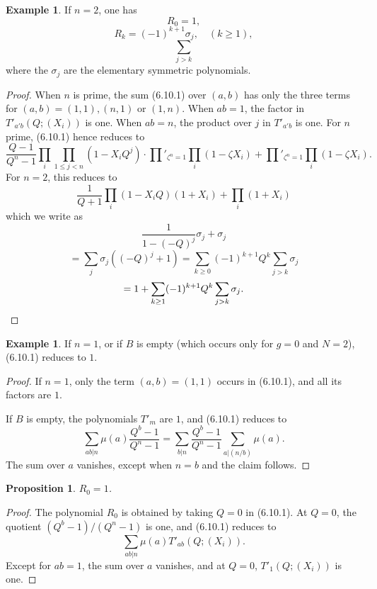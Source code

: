 \documentclass[11pt,a4paper]{article}
\theoremstyle{plain}
\newtheorem{proposition}[theorem]{Proposition}
\theoremstyle{definition}
\newtheorem{example}[theorem]{Example}
\begin{document}
\begin{example}
If $n = 2$, one has
\begin{equation}
R_0 = 1, \tag{6.11.1}
\end{equation}
\begin{equation}
R_k = (-1)^{k+1} \sigma_j, \quad (k \geq 1), \tag{6.11.2}
\end{equation}
\[
\sum_{j > k}
\]
where the $\sigma_j$ are the elementary symmetric polynomials.
\end{example}

\begin{proof}
When $n$ is prime, the sum (6.10.1) over $(a,b)$ has only the three terms for $(a,b) = (1,1), (n,1)$ or $(1,n)$. When $ab = 1$, the factor in $T'_{a'b}(Q; (X_i))$ is one. When $ab = n$, the product over $j$ in $T'_{a'b}$ is one. For $n$ prime, (6.10.1) hence reduces to
\[
\frac{Q - 1}{Q^n - 1} \prod_i \prod_{1 \leq j < n} (1 - X_i Q^j) \cdot \prod'_{\zeta^n=1} \prod_i (1 - \zeta X_i) + \prod'_{\zeta^n=1} \prod_i (1 - \zeta X_i).
\]
For $n = 2$, this reduces to
\[
\frac{1}{Q + 1} \prod_i (1 - X_i Q)(1 + X_i) + \prod_i (1 + X_i)
\]
which we write as
\[
\frac{1}{1 - (-Q)^j} \sigma_j + \sigma_j
\]
\[
= \sum_j \sigma_j ((-Q)^j + 1) = \sum_{k \geq 0} (-1)^{k+1} Q^k \sum_{j > k} \sigma_j
\]
\[
= 1 + \sum_{k \geq 1} (-1)^{k+1} Q^k \sum_{j > k} \sigma_j. \qedhere
\]
\end{proof}

\begin{example}
If $n = 1$, or if $B$ is empty (which occurs only for $g = 0$ and $N = 2$), (6.10.1) reduces to $1$.
\end{example}

\begin{proof}
If $n = 1$, only the term $(a,b) = (1,1)$ occurs in (6.10.1), and all its factors are $1$.

If $B$ is empty, the polynomials $T'_m$ are $1$, and (6.10.1) reduces to
\[
\sum_{ab | n} \mu(a) \frac{Q^b - 1}{Q^n - 1} = \sum_{b | n} \frac{Q^b - 1}{Q^n - 1} \sum_{a | (n/b)} \mu(a).
\]
The sum over $a$ vanishes, except when $n = b$ and the claim follows.
\end{proof}

\begin{proposition}
$R_0 = 1$.
\end{proposition}

\begin{proof}
The polynomial $R_0$ is obtained by taking $Q = 0$ in (6.10.1). At $Q = 0$, the quotient $(Q^b - 1)/(Q^n - 1)$ is one, and (6.10.1) reduces to
\[
\sum_{ab | n} \mu(a) T'_{ab}(Q; (X_i)).
\]
Except for $ab = 1$, the sum over $a$ vanishes, and at $Q = 0$, $T'_1(Q; (X_i))$ is one.
\end{proof}
\end{document}

